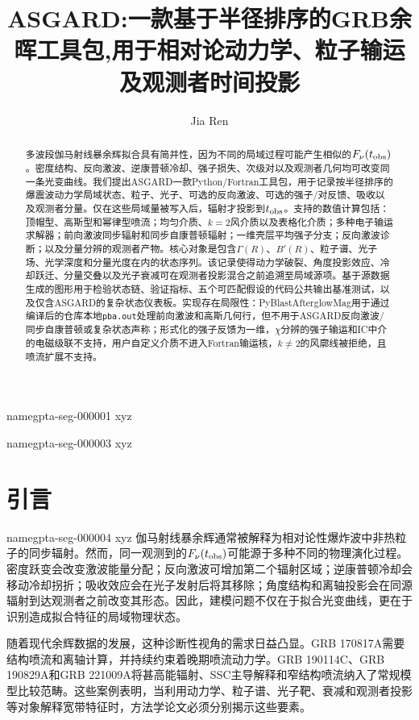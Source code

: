 \documentclass[twocolumn]{aastex702}
\makeatletter
\newcommand{\asgard}{\textsc{ASGARD}}
\newcommand{\grb}{伽马射线暴}
\providecommand{\gptareaderanchor}[1]{\pdfdest name{#1} xyz}%
\providecommand{\gptareaderanchor}[1]{\special{pdf:dest (#1) [ @thispage /XYZ @xpos @ypos null ]}}%
\makeatother
\begin{document}
\gptareaderanchor{gpta-seg-000001}%
\title{\asgard:一款基于半径排序的GRB余晖工具包,用于相对论动力学、粒子输运及观测者时间投影}

\author[0000-0000-0000-0000]{Jia Ren}

\begin{abstract}
多波段\grb{}余辉拟合具有简并性，因为不同的局域过程可能产生相似的\(F_\nu(t_{\rm obs})\)。密度结构、反向激波、逆康普顿冷却、强子损失、次级对以及观测者几何均可改变同一条光变曲线。我们提出\asgard 一款Python/Fortran工具包，用于记录按半径排序的爆震波动力学局域状态、粒子、光子、可选的反向激波、可选的强子/对反馈、吸收以及观测者分量。仅在这些局域量被写入后，辐射才投影到\(t_{\rm obs}\)。支持的数值计算包括：顶帽型、高斯型和幂律型喷流；均匀介质、\(k=2\)风介质以及表格化介质；多种电子输运求解器；前向激波同步辐射和同步自康普顿辐射；一维壳层平均强子分支；反向激波诊断；以及分量分辨的观测者产物。核心对象是包含\(\Gamma(R)\)、\(B'(R)\)、粒子谱、光子场、光学深度和分量光度在内的状态序列。该记录使得动力学破裂、角度投影效应、冷却跃迁、分量交叠以及光子衰减可在观测者投影混合之前追溯至局域源项。基于源数据生成的图形用于检验状态链、验证指标、五个可匹配假设的代码公共输出基准测试，以及仅含ASGARD的复杂状态仪表板。实现存在局限性：PyBlastAfterglowMag用于通过编译后的仓库本地\texttt{pba.out}处理前向激波和高斯几何行，但不用于ASGARD反向激波/同步自康普顿或复杂状态声称；形式化的强子反馈为一维，\(\chi\)分辨的强子输运和IC中介的电磁级联不支持，用户自定义介质不进入Fortran输运核，\(k\ne2\)的风廓线被拒绝，且喷流扩展不支持。
\end{abstract}


\gptareaderanchor{gpta-seg-000003}%

\section{引言} \label{sec:intro}


\gptareaderanchor{gpta-seg-000004}%
伽马射线暴余辉通常被解释为相对论性爆炸波中非热粒子的同步辐射\citep{MeszarosRees1997,Sari1998,Granot2002}。然而，同一观测到的\(F_\nu(t_{\rm obs})\)可能源于多种不同的物理演化过程。密度跃变会改变激波能量分配；反向激波可增加第二个辐射区域；逆康普顿冷却会移动冷却拐折；吸收效应会在光子发射后将其移除；角度结构和离轴投影会在同源辐射到达观测者之前改变其形态。因此，建模问题不仅在于拟合光变曲线，更在于识别造成拟合特征的局域物理状态。

随着现代余辉数据的发展，这种诊断性视角的需求日益凸显。GRB 170817A需要结构喷流和离轴计算，并持续约束着晚期喷流动力学\citep{Troja2017GW170817Xray,Hallinan2017GW170817Radio,LambKobayashi2017Structured,Mooley2018WideAngle,Mooley2018Superluminal,Lazzati2018CollimatedJet,Margutti2018GW170817,Alexander2018GW170817,Ghirlanda2019StructuredJet,Troja2019GW170817,Hajela2022GW170817,Katira2025GW170817,Ryan2024}。GRB 190114C、GRB 190829A和GRB 221009A将甚高能辐射、SSC主导解释和窄结构喷流纳入了常规模型比较范畴\citep{MAGIC2019TeV,MAGIC2019IC,HESS2019VHE,HESS2021GRB190829A,LHAASO2023TeVAfterglow,LHAASO2023Beyond10TeV,Laskar2023GRB221009A,OConnor2023GRB221009A}。这些案例表明，当利用动力学、粒子谱、光子靶、衰减和观测者投影等对象解释宽带特征时，方法学论文必须分别揭示这些要素。
\end{document}
